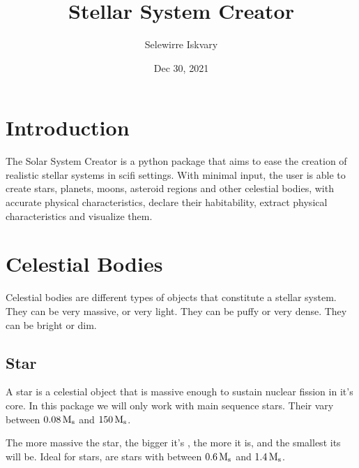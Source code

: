 \documentclass[letterpaper,10pt,english]{sphinxmanual}
\title{Stellar System Creator}
\date{Dec 30, 2021}
\author{Selewirre Iskvary}
\begin{document}
\pagestyle{empty}
\sphinxmaketitle
\pagestyle{plain}
\sphinxtableofcontents
\pagestyle{normal}
\label{\detokenize{index::doc}}



\chapter{Introduction}
\label{\detokenize{introduction:introduction}}\label{\detokenize{introduction::doc}}
\sphinxAtStartPar
The Solar System Creator is a python package that aims to ease the creation of realistic
stellar systems in sci\sphinxhyphen{}fi settings. With minimal input, the user is able to create stars, planets,
moons, asteroid regions and other celestial bodies, with accurate physical characteristics, declare their habitability,
extract physical characteristics and visualize them.


\chapter{Celestial Bodies}
\label{\detokenize{celestial_bodies/celestial_bodies:celestial-bodies}}\label{\detokenize{celestial_bodies/celestial_bodies::doc}}\label{\detokenize{celestial_bodies/celestial_bodies:id1}}
\sphinxAtStartPar
Celestial bodies are different types of objects that constitute a stellar system.
They can be very massive, or very light. They can be puffy or very dense.
They can be bright or dim.


\section{Star}
\label{\detokenize{celestial_bodies/star:star}}\label{\detokenize{celestial_bodies/star::doc}}\label{\detokenize{celestial_bodies/star:id1}}
\sphinxAtStartPar
A star is a celestial object that is massive enough to sustain nuclear fission in it’s core.
In this package we will only work with main sequence stars.
Their {\hyperref[\detokenize{quantities/material/mass:id1}]{}} vary between \(0.08 \, {\rm M_s}\) and \(150 \, {\rm M_s}\).

\sphinxAtStartPar
The more massive the star, the bigger it’s {\hyperref[\detokenize{quantities/geometric/radius:id1}]{}}, the more {\hyperref[\detokenize{quantities/surface/emission/luminosity:id1}]{}} it is,
and the smallest its {\hyperref[\detokenize{quantities/life/lifetime:id1}]{}} will be.
Ideal for {\hyperref[\detokenize{quantities/habitability/habitability:id1}]{}} stars, are stars with {\hyperref[\detokenize{quantities/material/mass:id1}]{}} between \(0.6 \, {\rm M_s}\)
and \(1.4 \, {\rm M_s}\).
\end{document}

